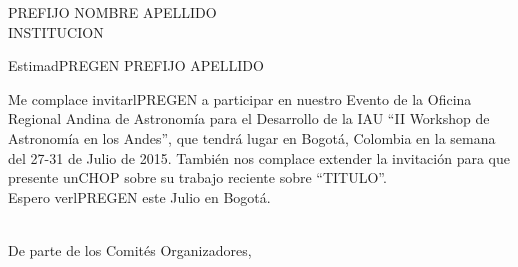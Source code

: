 \documentclass[
	pagenumber=false, %
	parskip=half, %
	fromalign=right, %
	foldmarks=false, %
	addrfield=true %
	]{scrlttr2}
\date{Junio 22 de 2015} %
\begin{document}
 
\begin{letter}{PREFIJO NOMBRE APELLIDO\\INSTITUCION\\} %




\opening{EstimadPREGEN PREFIJO APELLIDO}



Me complace invitarlPREGEN a participar en nuestro Evento de la Oficina Regional Andina de Astronom\'ia para el Desarrollo de la IAU  ``II Workshop de Astronom\'ia en los Andes'', que tendr\'a lugar en Bogot\'a, Colombia en la semana del 27-31 de Julio de 2015. Tambi\'en nos complace extender la invitaci\'on para que presente unCHOP sobre su trabajo reciente sobre ``TITULO''.\\

Espero verlPREGEN este Julio en Bogot\'a.\\
\\

\closing{De parte de los Comit\'es Organizadores,}



\end{letter}
 
\end{document}
